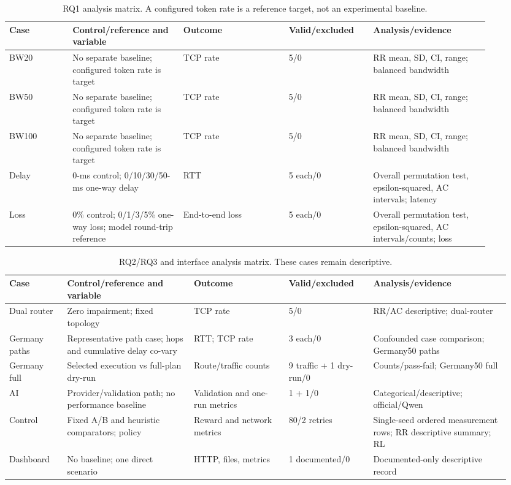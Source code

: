 \begin{table}[h]
\caption{RQ1 analysis matrix. A configured token rate is a reference target, not an experimental baseline.}
\label{tab:experimental-matrix-rq1}
\centering
\setlength{\tabcolsep}{1pt}
\begin{tabular}{p{0.12\linewidth}p{0.21\linewidth}p{0.20\linewidth}p{0.16\linewidth}p{0.22\linewidth}}
\hline
Case & Control/reference and variable & Outcome & Valid/excluded & Analysis/evidence \\
\hline
BW20 & No separate baseline; configured token rate is target & TCP rate & 5/0 & RR mean, SD, CI, range; balanced bandwidth \\
BW50 & No separate baseline; configured token rate is target & TCP rate & 5/0 & RR mean, SD, CI, range; balanced bandwidth \\
BW100 & No separate baseline; configured token rate is target & TCP rate & 5/0 & RR mean, SD, CI, range; balanced bandwidth \\
Delay & 0-ms control; 0/10/30/50-ms one-way delay & RTT & 5 each/0 & Overall permutation test, epsilon-squared, AC intervals; latency \\
Loss & 0\% control; 0/1/3/5\% one-way loss; model round-trip reference & End-to-end loss & 5 each/0 & Overall permutation test, epsilon-squared, AC intervals/counts; loss \\
\hline
\end{tabular}
\end{table}

\begin{table}[h]
\caption{RQ2/RQ3 and interface analysis matrix. These cases remain descriptive.}
\label{tab:experimental-matrix-rq23}
\centering
\setlength{\tabcolsep}{1pt}
\begin{tabular}{p{0.11\linewidth}p{0.24\linewidth}p{0.18\linewidth}p{0.16\linewidth}p{0.26\linewidth}}
\hline
Case & Control/reference and variable & Outcome & Valid/excluded & Analysis/evidence \\
\hline
Dual router & Zero impairment; fixed topology & TCP rate & 5/0 & RR/AC descriptive; dual-router \\
Germany paths & Representative path case; hops and cumulative delay co-vary & RTT; TCP rate & 3 each/0 & Confounded case comparison; Germany50 paths \\
Germany full & Selected execution vs full-plan dry-run & Route/traffic counts & 9 traffic + 1 dry-run/0 & Counts/pass-fail; Germany50 full \\
AI & Provider/validation path; no performance baseline & Validation and one-run metrics & 1 + 1/0 & Categorical/descriptive; official/Qwen \\
Control & Fixed A/B and heuristic comparators; policy & Reward and network metrics & 80/2 retries & Single-seed ordered measurement rows; RR descriptive summary; RL \\
Dashboard & No baseline; one direct scenario & HTTP, files, metrics & 1 documented/0 & Documented-only descriptive record \\
\hline
\end{tabular}
\end{table}
